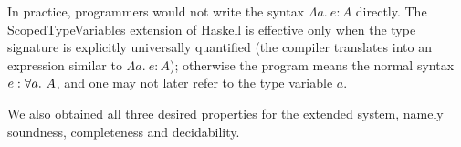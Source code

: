 In practice, programmers would not write the syntax $\Lambda a.~e : A$ directly.
The ScopedTypeVariables extension of Haskell is effective only
when the type signature is explicitly universally quantified
(the compiler translates into an expression similar to $\Lambda a.~e : A$);
otherwise the program means the normal syntax $e : \all A$,
and one may not later refer to the type variable $a$.

We also obtained all three desired properties for the extended system,
namely soundness, completeness and decidability.

